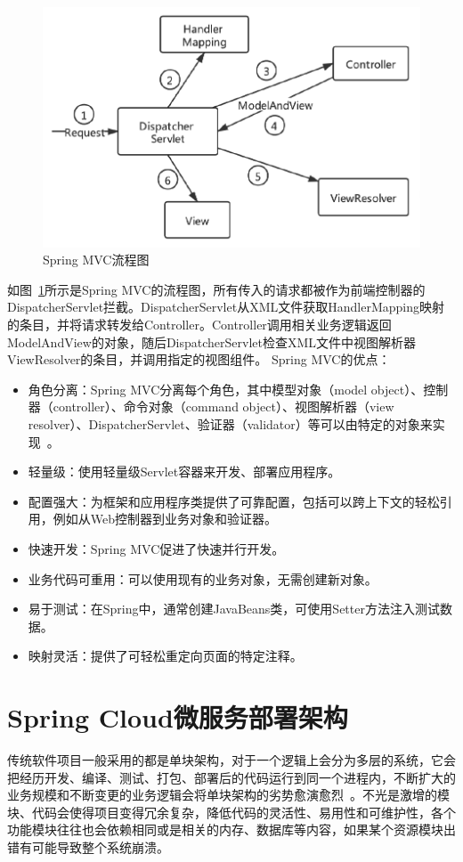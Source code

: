 \begin{figure}[htbp!]
    \centering
    \includegraphics[width=5in]{FIGs/chapter2/springMVC2.pdf}
    \caption{Spring MVC流程图}\label{fig_springMVC2CH2}
\end{figure}

如图~\ref{fig_springMVC2CH2}所示是Spring MVC的流程图，所有传入的请求都被作为前端控制器的DispatcherServlet拦截。DispatcherServlet从XML文件获取HandlerMapping映射的条目，并将请求转发给Controller。Controller调用相关业务逻辑返回ModelAndView的对象，随后DispatcherServlet检查XML文件中视图解析器ViewResolver的条目，并调用指定的视图组件。
Spring MVC的优点：
\begin{itemize}
    \item 角色分离：Spring MVC分离每个角色，其中模型对象（model object）、控制器（controller）、命令对象（command object）、视图解析器（view resolver）、DispatcherServlet、验证器（validator）等可以由特定的对象来实现~\cite{ab2006}。
    \item 轻量级：使用轻量级Servlet容器来开发、部署应用程序。
    \item 配置强大：为框架和应用程序类提供了可靠配置，包括可以跨上下文的轻松引用，例如从Web控制器到业务对象和验证器。
    \item 快速开发：Spring MVC促进了快速并行开发。
    \item 业务代码可重用：可以使用现有的业务对象，无需创建新对象。
    \item 易于测试：在Spring中，通常创建JavaBeans类，可使用Setter方法注入测试数据。
    \item 映射灵活：提供了可轻松重定向页面的特定注释。
\end{itemize}

\section{Spring Cloud微服务部署架构}
传统软件项目一般采用的都是单块架构，对于一个逻辑上会分为多层的系统，它会把经历开发、编译、测试、打包、部署后的代码运行到同一个进程内，不断扩大的业务规模和不断变更的业务逻辑会将单块架构的劣势愈演愈烈~\cite{ln2019}。不光是激增的模块、代码会使得项目变得冗余复杂，降低代码的灵活性、易用性和可维护性，各个功能模块往往也会依赖相同或是相关的内存、数据库等内容，如果某个资源模块出错有可能导致整个系统崩溃。

